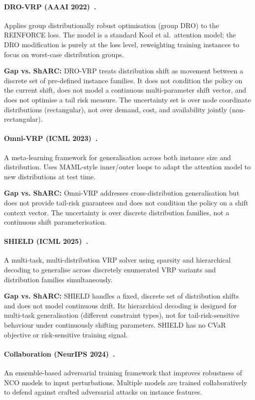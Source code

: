 \documentclass[11pt]{article}
\begin{document}
\paragraph{DRO-VRP (AAAI 2022)~\cite{jiang2022dro}.}
Applies group distributionally robust optimisation (group DRO) to the
REINFORCE loss.  The model is a standard Kool et al.\ attention model;
the DRO modification is purely at the loss level, reweighting training
instances to focus on worst-case distribution groups.

\textbf{Gap vs. ShARC:} DRO-VRP treats distribution shift as movement
between a discrete set of pre-defined instance families.  It does not
condition the policy on the current shift, does not model a continuous
multi-parameter shift vector, and does not optimise a tail risk measure.
The uncertainty set is over node coordinate distributions (rectangular),
not over demand, cost, and availability jointly (non-rectangular).

\paragraph{Omni-VRP (ICML 2023)~\cite{zhou2023omni}.}
A meta-learning framework for generalisation across both instance size and
distribution.  Uses MAML-style inner/outer loops to adapt the attention
model to new distributions at test time.

\textbf{Gap vs. ShARC:} Omni-VRP addresses cross-distribution
generalisation but does not provide tail-risk guarantees and does not
condition the policy on a shift context vector.  The uncertainty is over
discrete distribution families, not a continuous shift parameterisation.

\paragraph{SHIELD (ICML 2025)~\cite{goh2025shield}.}
A multi-task, multi-distribution VRP solver using sparsity and hierarchical
decoding to generalise across discretely enumerated VRP variants and
distribution families simultaneously.

\textbf{Gap vs. ShARC:} SHIELD handles a fixed, discrete set of
distribution shifts and does not model continuous drift.  Its hierarchical
decoding is designed for multi-task generalisation (different constraint
types), not for tail-risk-sensitive behaviour under continuously shifting
parameters.  SHIELD has no CVaR objective or risk-sensitive training signal.

\paragraph{Collaboration (NeurIPS 2024)~\cite{zhou2024collaboration}.}
An ensemble-based adversarial training framework that improves robustness
of NCO models to input perturbations.  Multiple models are trained
collaboratively to defend against crafted adversarial attacks on instance
features.
\end{document}
